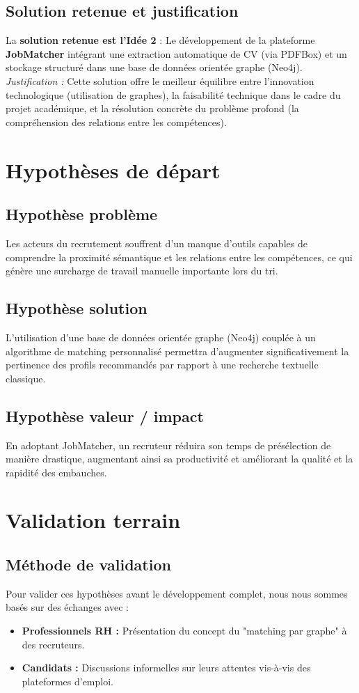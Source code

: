 \documentclass[12pt,a4paper]{report}
\begin{document}
\subsection{Solution retenue et justification}
La \textbf{solution retenue est l'Idée 2} : Le développement de la plateforme \textbf{JobMatcher} intégrant une extraction automatique de CV (via PDFBox) et un stockage structuré dans une base de données orientée graphe (Neo4j). 
\textit{Justification :} Cette solution offre le meilleur équilibre entre l'innovation technologique (utilisation de graphes), la faisabilité technique dans le cadre du projet académique, et la résolution concrète du problème profond (la compréhension des relations entre les compétences).

\section{Hypothèses de départ}

\subsection{Hypothèse problème}
Les acteurs du recrutement souffrent d'un manque d'outils capables de comprendre la proximité sémantique et les relations entre les compétences, ce qui génère une surcharge de travail manuelle importante lors du tri.

\subsection{Hypothèse solution}
L'utilisation d'une base de données orientée graphe (Neo4j) couplée à un algorithme de matching personnalisé permettra d'augmenter significativement la pertinence des profils recommandés par rapport à une recherche textuelle classique.

\subsection{Hypothèse valeur / impact}
En adoptant JobMatcher, un recruteur réduira son temps de présélection de manière drastique, augmentant ainsi sa productivité et améliorant la qualité et la rapidité des embauches.

\section{Validation terrain}

\subsection{Méthode de validation}
Pour valider ces hypothèses avant le développement complet, nous nous sommes basés sur des échanges avec :
\begin{itemize}
    \item \textbf{Professionnels RH :} Présentation du concept du "matching par graphe" à des recruteurs.
    \item \textbf{Candidats :} Discussions informelles sur leurs attentes vis-à-vis des plateformes d'emploi.
\end{itemize}
\end{document}

